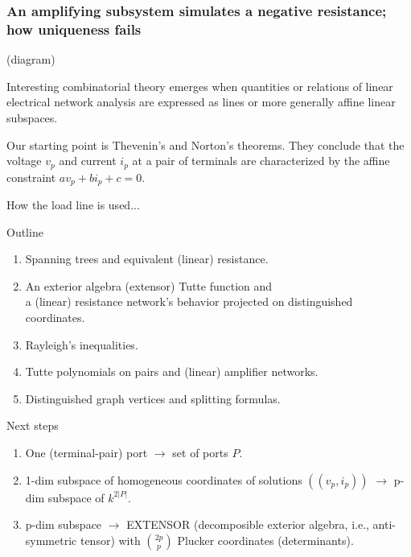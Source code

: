 \documentclass{beamer}
\begin{document}
\begin{frame}
\frametitle{An amplifying subsystem simulates a negative resistance; 
how uniqueness fails}

(diagram)

\end{frame}



\begin{frame}
Interesting combinatorial theory emerges when quantities or relations
of linear electrical network analysis are expressed as lines or more
generally affine linear subspaces.

Our starting point is Thevenin's and Norton's theorems.  They conclude that
the voltage $v_p$ and current $i_p$ at a pair of terminals are characterized
by the affine constraint $av_p + bi_p + c = 0$.  

How the load line is used...

\end{frame}



\begin{frame}{Outline}
\begin{enumerate}
\item Spanning trees and equivalent (linear) resistance.
\item An exterior algebra (extensor) Tutte function and\\
 a (linear) resistance network's
behavior projected on distinguished coordinates.
\item Rayleigh's inequalities.
\item Tutte polynomials on pairs and (linear) amplifier networks.
\item Distinguished graph vertices and splitting formulas.
\end{enumerate}
\end{frame}


\begin{frame}{Next steps}
\begin{enumerate}
\item One (terminal-pair) port $\rightarrow$ set of ports $P$.
\item 1-dim subspace of homogeneous coordinates of solutions
$((v_p, i_p))$ $\rightarrow$ p-dim subspace of $k^{2|P|}$.
\item p-dim subspace $\rightarrow$ EXTENSOR (decomposible
exterior algebra, i.e., anti-symmetric tensor) with $\binom{2p}{p}$ Plucker
coordinates (determinants).
\end{enumerate}
\end{frame}
\end{document}
